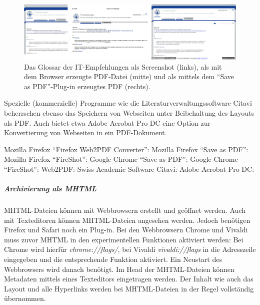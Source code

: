\begin{figure}[h!tb]
  \begin{center}
    \includegraphics[width=1\textwidth]{bilder/web_pdf}
  \end{center}
  \caption{Das Glossar der IT-Empfehlungen als Screenshot (links), als mit dem Browser erzeugte PDF-Datei (mitte) und als mittels dem "`Save as PDF"'-Plug-in erzeugtes PDF (rechts).}
\end{figure}

Spezielle (kommerzielle) Programme wie die Literaturverwaltungssoftware Citavi beherrschen ebenso das Speichern von Webseiten unter Beibehaltung des Layouts als PDF. Auch bietet etwa Adobe Acrobat Pro DC eine Option zur Konvertierung von Webseiten in ein PDF-Dokument.

\begin{flushleft}
	Mozilla Firefox "`Firefox Web2PDF Converter"': 
	Mozilla Firefox "`Save as PDF"': 
	Mozilla Firefox "`FireShot"': 
	Google Chrome "`Save as PDF"': 
	Google Chrome "`FireShot"': 
	Web2PDF: 
	Swiss Academic Software Citavi:   
	Adobe Acrobat Pro DC: 
\end{flushleft}


\subparagraph{Archivierung als MHTML}

MHTML-Dateien können mit Webbrowsern erstellt und geöffnet werden. Auch mit Texteditoren können MHTML-Dateien angesehen werden. Jedoch benötigen Firefox und Safari noch ein Plug-in. Bei den Webbrowsern Chrome und Vivaldi muss zuvor MHTML in den experimentellen Funktionen aktiviert werden: Bei Chrome wird hierfür \emph{chrome://flags/}, bei Vivaldi \emph{vivaldi://flags} in die Adresszeile eingegeben und die entsprechende Funktion aktiviert. Ein Neustart des Webbrowsers wird danach benötigt. Im Head der MHTML-Dateien können Metadaten mittels eines Texteditors eingetragen werden. Der Inhalt wie auch das Layout und alle Hyperlinks werden bei MHTML-Dateien in der Regel vollständig übernommen. 

